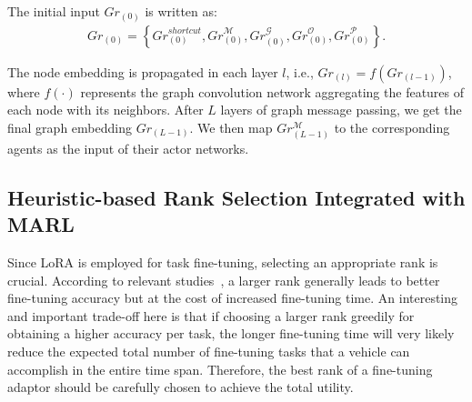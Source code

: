 The initial input ${Gr}_{(0)}$ is written as: 
\begin{align}
    {Gr}_{(0)} = \left\{ {Gr}_{(0)}^{shortcut}, {Gr}_{(0)}^{\mathcal{M}}, {Gr}_{(0)}^{\mathcal{G}}, {Gr}_{(0)}^{\mathcal{O}},{Gr}_{(0)}^{\mathcal{P}} \right \}.
\end{align} 

The node embedding is propagated in each layer $l$, i.e., ${Gr_{(l)}} = f({Gr_{(l-1)}})$, where $f(\cdot)$ represents the graph convolution network aggregating the features of each node with its neighbors. After $L$ layers of graph message passing, we get the final graph embedding $Gr_{(L-1)}$. We then map $Gr^{\mathcal{M}}_{(L- 1)}$ to the corresponding agents as the input of their actor networks.
\begin{table}[ht]
\centering
\caption{Impact of Rank on Fine-Tuning Accuracy and Time}
\label{tab:rank}
\end{table}
\subsection{Heuristic-based Rank Selection Integrated with MARL}
Since LoRA is employed for task fine-tuning, selecting an appropriate rank is crucial. According to relevant studies~\cite{bai2024federated}, a larger rank generally leads to better fine-tuning accuracy but at the cost of increased fine-tuning time. An interesting and important trade-off here is that if choosing a larger rank greedily for obtaining a higher accuracy per task, the longer fine-tuning time will very likely reduce the expected total number of fine-tuning tasks that a vehicle can accomplish in the entire time span. Therefore, the best rank of a fine-tuning adaptor should be carefully chosen to achieve the total utility. 


